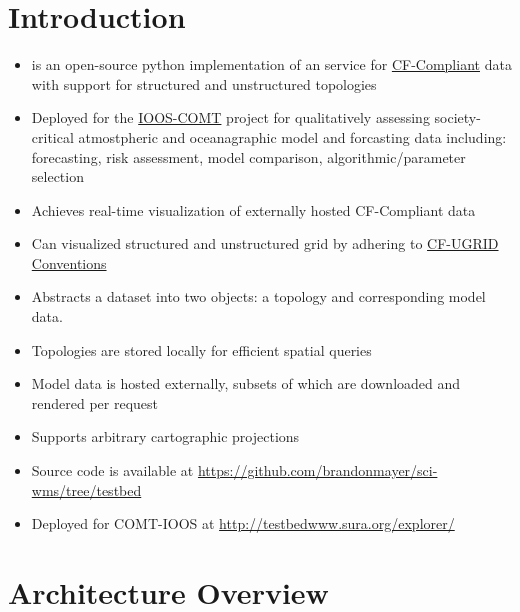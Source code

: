 \documentclass[noback,noborder,portrait,twocolumn]{cuposter}
\begin{document}
\section{Introduction}
\begin{itemize}
  \item \sciwms{} is an open-source python implementation of an \href{http://www.opengeospatial.org/standards/wms}{\color{blue}\ogc{} \wms{}} service for \href{http://cfconventions.org/}{\color{blue}CF-Compliant} data with
    support for structured and unstructured topologies
  
  \item Deployed for the
    \href{http://www.ioos.noaa.gov/modeling/testbed.html}{{\color{blue}IOOS-COMT}}
    project for qualitatively assessing society-critical atmostpheric
    and oceanagraphic model and forcasting data including:
    forecasting, risk assessment, model comparison,
    algorithmic/parameter selection
    
  \item Achieves real-time visualization of
    externally hosted CF-Compliant data

  \item Can visualized structured and unstructured grid by adhering to
    \href{https://github.com/ugrid-conventions/ugrid-conventions/blob/v0.9.0/ugrid-conventions.md}{\color{blue}CF-UGRID Conventions}

  \item Abstracts a dataset into two objects: a topology
      and corresponding model data.
    
  \item Topologies are stored locally for efficient spatial queries

  \item Model data is hosted externally, subsets of which are
    downloaded and rendered per request

  \item Supports arbitrary cartographic projections 
  
  \item Source code is available at {\color{blue}
    \url{https://github.com/brandonmayer/sci-wms/tree/testbed}}
    
  \item Deployed for COMT-IOOS at {\color{blue}
    \url{http://testbedwww.sura.org/explorer/}}
\end{itemize}


\section{Architecture Overview}
\end{document}

